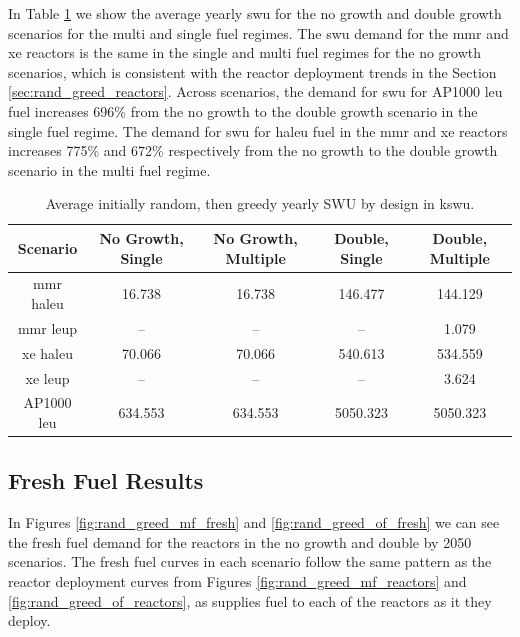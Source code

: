 
In Table \ref{tab:rand_greed_swu_avg} we show the average yearly \gls{swu} for the no growth and double growth scenarios for the multi and single fuel regimes. The \gls{swu} demand for the \gls{mmr} and \gls{xe} reactors is the same in the single and multi fuel regimes for the no growth scenarios, which is consistent with the reactor deployment trends in the Section \ref{sec:rand_greed_reactors}. Across scenarios, the demand for \gls{swu} for AP1000 \gls{leu} fuel increases 696\% from the no growth to the double growth scenario in the single fuel regime. The demand for \gls{swu} for \gls{haleu} fuel in the \gls{mmr} and \gls{xe} reactors increases 775\% and 672\% respectively from the no growth to the double growth scenario in the multi fuel regime.

\begin{table}[H]
    \centering
    \caption{Average initially random, then greedy yearly SWU by design in k\gls{swu}.}
    \label{tab:rand_greed_swu_avg}
    \begin{tabular}{c c c c c}
       \hline
       Scenario & No Growth, Single & No Growth, Multiple & Double, Single & Double, Multiple  \\
       \hline
       \gls{mmr} \gls{haleu}   & 16.738  & 16.738  & 146.477  & 144.129  \\
       \gls{mmr} \gls{leup}    & --      & --      & --       & 1.079    \\
       \gls{xe} \gls{haleu}    & 70.066  & 70.066  & 540.613  & 534.559  \\
       \gls{xe} \gls{leup}     & --      & --      & --       & 3.624    \\
       AP1000 \gls{leu}        & 634.553 & 634.553 & 5050.323 & 5050.323 \\
       \hline
    \end{tabular}
\end{table}



\subsection{Fresh Fuel Results}
\label{sec:rand_greed_fresh}

In Figures \ref{fig:rand_greed_mf_fresh} and \ref{fig:rand_greed_of_fresh} we can see the fresh fuel demand for the reactors in the no growth and double by 2050 scenarios. The fresh fuel curves in each scenario follow the same pattern as the reactor deployment curves from Figures \ref{fig:rand_greed_mf_reactors} and \ref{fig:rand_greed_of_reactors}, as \cyclus supplies fuel to each of the reactors as it they deploy.


